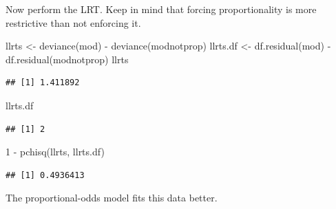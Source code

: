 \documentclass[
  ignorenonframetext,
]{beamer}
\newenvironment{Shaded}{\begin{snugshade}}{\end{snugshade}}
\newcommand{\DecValTok}[1]{\textcolor[rgb]{0.00,0.00,0.81}{#1}}
\newcommand{\FunctionTok}[1]{\textcolor[rgb]{0.00,0.00,0.00}{#1}}
\newcommand{\NormalTok}[1]{#1}
\newcommand{\OtherTok}[1]{\textcolor[rgb]{0.56,0.35,0.01}{#1}}
\newcommand{\SpecialCharTok}[1]{\textcolor[rgb]{0.00,0.00,0.00}{#1}}
\begin{document}
\begin{frame}[fragile]{}
\protect\hypertarget{section-9}{}
Now perform the LRT. Keep in mind that forcing proportionality is more
restrictive than not enforcing it.

\vspace{12pt}
\tiny

\begin{Shaded}
\begin{Highlighting}[]
\NormalTok{llrts }\OtherTok{\textless{}{-}} \FunctionTok{deviance}\NormalTok{(mod) }\SpecialCharTok{{-}} \FunctionTok{deviance}\NormalTok{(modnotprop)}
\NormalTok{llrts.df }\OtherTok{\textless{}{-}} \FunctionTok{df.residual}\NormalTok{(mod) }\SpecialCharTok{{-}} \FunctionTok{df.residual}\NormalTok{(modnotprop)}
\NormalTok{llrts}
\end{Highlighting}
\end{Shaded}

\begin{verbatim}
## [1] 1.411892
\end{verbatim}

\begin{Shaded}
\begin{Highlighting}[]
\NormalTok{llrts.df}
\end{Highlighting}
\end{Shaded}

\begin{verbatim}
## [1] 2
\end{verbatim}

\begin{Shaded}
\begin{Highlighting}[]
\DecValTok{1} \SpecialCharTok{{-}} \FunctionTok{pchisq}\NormalTok{(llrts, llrts.df)}
\end{Highlighting}
\end{Shaded}

\begin{verbatim}
## [1] 0.4936413
\end{verbatim}

\vspace{12pt}
\normalsize

The proportional-odds model fits this data better.
\end{frame}
\end{document}
